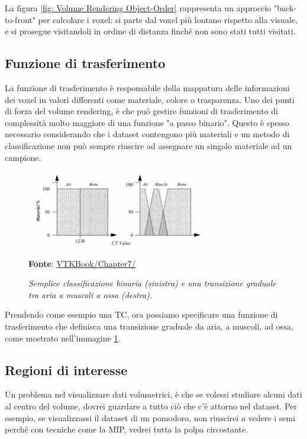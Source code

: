 La figura \ref{fig: Volume Rendering Object-Order} rappresenta un approccio "back-to-front" per calcolare i voxel: si parte dal voxel più lontano rispetto alla visuale, e si prosegue visitandoli in ordine di distanza finché non sono stati tutti visitati.

\subsection{Funzione di trasferimento}\label{sec:funzione-trasferimento}
La funzione di trasferimento è responsabile della mappatura delle informazioni dei voxel in valori differenti come materiale, colore o trasparenza. Uno dei punti di forza del volume rendering, è che può gestire funzioni di trasferimento di complessità molto maggiore di una funzione "a passo binario". Questo è spesso necessario considerando che i dataset contengono più materiali e un metodo di classificazione non può sempre riuscire ad assegnare un singolo materiale ad un campione.

\begin{figure}[h]
    \centering
    \includegraphics[width=0.7\textwidth]{immagini/volumerendering/functions.png}
    \caption{\textit{Semplice classificazione binaria (sinistra) e una transizione graduale tra aria a muscoli a ossa (destra).}}
    \textbf{Fonte}: \href{https://lorensen.github.io/VTKExamples/site/VTKBook/07Chapter7/}{VTKBook/Chapter7/}
    \label{fig: Funzione di Trasferimento}
\end{figure}

Prendendo come esempio una TC, ora possiamo specificare una funzione di trasferimento che definisca una transizione graduale da aria, a muscoli, ad ossa, come mostrato nell'immagine \ref{fig: Funzione di Trasferimento}.

\subsection{Regioni di interesse}\label{sec:regioni-di-interesse}
Un problema nel visualizzare dati volumetrici, è che se volessi studiare alcuni dati al centro del volume, dovrei guardare a tutto ciò che c'è attorno nel dataset. Per esempio, se visualizzassi il dataset di un pomodoro, non riuscirei a vedere i semi perché con tecniche come la MIP, vedrei tutta la polpa circostante.

